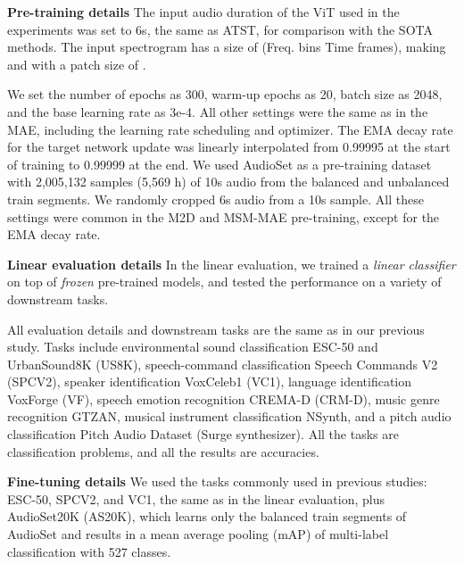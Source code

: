 \documentclass{article}
\begin{document}
\vspace{0.1cm}
\noindent\textbf{Pre-training details}\hspace{0.2cm}
The input audio duration of the ViT used in the experiments was set to 6s, the same as ATST, for comparison with the SOTA methods. The input spectrogram has a size of  (Freq. bins  Time frames), making  and  with a patch size of .

We set the number of epochs as 300, warm-up epochs as 20, batch size as 2048, and the base learning rate as 3e-4. All other settings were the same as in the MAE, including the learning rate scheduling and optimizer. The EMA decay rate  for the target network update was linearly interpolated from 0.99995 at the start of training to 0.99999 at the end.
We used AudioSet\cite{gemmeke2017audioset} as a pre-training dataset with 2,005,132 samples (5,569 h) of 10s audio from the balanced and unbalanced train segments.
We randomly cropped 6s audio from a 10s sample.
All these settings were common in the M2D and MSM-MAE pre-training, except for the EMA decay rate.

\vspace{0.1cm}
\noindent\textbf{Linear evaluation details}\hspace{0.2cm}
In the linear evaluation, we trained a \textit{linear classifier} on top of \textit{frozen} pre-trained models, and tested the performance on a variety of downstream tasks.

All evaluation details and downstream tasks are the same as in our previous study\cite{niizumi2022byol-a}. Tasks include environmental sound classification ESC-50\cite{piczak2015esc50} and UrbanSound8K\cite{salamon2014urbansound} (US8K), speech-command classification Speech Commands V2\cite{speechcommandsv2} (SPCV2), speaker identification VoxCeleb1\cite{voxceleb} (VC1), language identification VoxForge\cite{voxforge} (VF), speech emotion recognition CREMA-D\cite{cao2014cremad} (CRM-D), music genre recognition GTZAN\cite{gt2013gtzan}, musical instrument classification NSynth\cite{nsynth2017}, and a pitch audio classification Pitch Audio Dataset (Surge synthesizer)\cite{turian2021torchsynth}.
All the tasks are classification problems, and all the results are accuracies.

\vspace{0.1cm}
\noindent\textbf{Fine-tuning details}\hspace{0.2cm}
We used the tasks commonly used in previous studies: ESC-50, SPCV2, and VC1, the same as in the linear evaluation, plus AudioSet20K (AS20K), which learns only the balanced train segments of AudioSet\cite{gemmeke2017audioset} and results in a mean average pooling (mAP) of multi-label classification with 527 classes.
\end{document}
